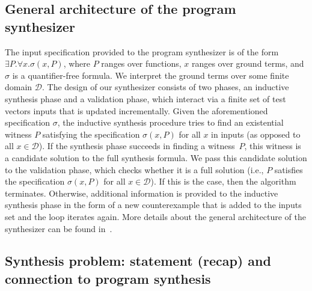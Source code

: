 \documentclass[runningheads,a4paper]{llncs}
\begin{document}
\subsection{General architecture of the program synthesizer}
\label{synthesizer-general}
The input specification provided to the program synthesizer is of the form
$\exists P .  \forall x.  \sigma(x, P)$, 
where $P$ ranges over functions, 
$x$ ranges over ground terms, 
and $\sigma$ is a quantifier-free formula.  
We interpret the ground terms over some finite domain $\mathcal{D}$.
%
The design of our synthesizer consists of two phases, an inductive
synthesis phase and a validation phase, which interact via a finite
set of test vectors {\sc inputs} that is updated incrementally.  Given
the aforementioned specification $\sigma$, the inductive synthesis
procedure tries to find an existential witness $P$ satisfying
the specification $\sigma(x, P)$ for all $x$ in {\sc
  inputs} (as opposed to all $x \in \mathcal{D}$).
%
If the synthesis phase succeeds in finding a witness~$P$, this
witness is a candidate solution to the full synthesis formula.  We
pass this candidate solution to the validation phase, which checks
whether it is a full solution (i.e., $P$ satisfies the
specification $\sigma(x, P)$ for all
$x\in\mathcal{D}$).  If this is the case, then the algorithm
terminates.  Otherwise, additional information is provided to the
inductive synthesis phase in the form of a new counterexample that is
added to the {\sc inputs} set and the loop iterates again.
More details about the general architecture of the synthesizer can
be found in~\cite{DBLP:conf/lpar/DavidKL15}.

\subsection{Synthesis problem: statement (recap) and connection to program synthesis}

\end{document}
